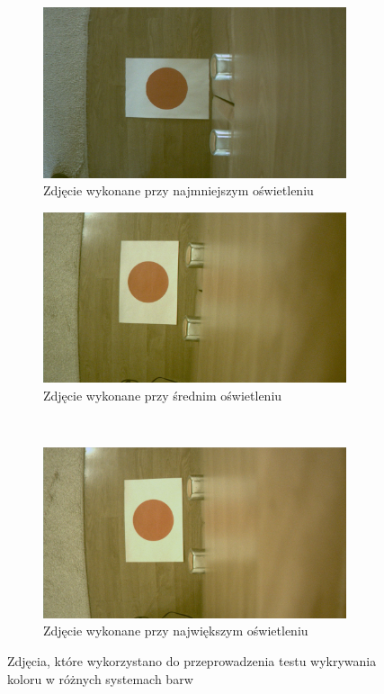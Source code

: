 \begin{figure}
	\centering
	\begin{subfigure}{0.5\textwidth}
		\centering
		\includegraphics[width=0.98\textwidth]{osw1.jpg}
		\caption{Zdjęcie wykonane przy najmniejszym oświetleniu}
		\label{fig:osw1}
	\end{subfigure}%
	\begin{subfigure}{0.5\textwidth}
		\centering
		\includegraphics[width=0.98\textwidth]{osw2.jpg}
		\caption{Zdjęcie wykonane przy średnim oświetleniu}
		\label{fig:osw2}
	\end{subfigure}\\
	\begin{subfigure}{0.5\textwidth}
		\centering
		\includegraphics[width=0.98\textwidth]{osw3.jpg}
		\caption{Zdjęcie wykonane przy największym oświetleniu}
		\label{fig:osw3}
	\end{subfigure}
	\caption{Zdjęcia, które wykorzystano do przeprowadzenia testu wykrywania koloru w różnych systemach barw}
	\label{fig:zdjecia_wejsciowe}
\end{figure}
